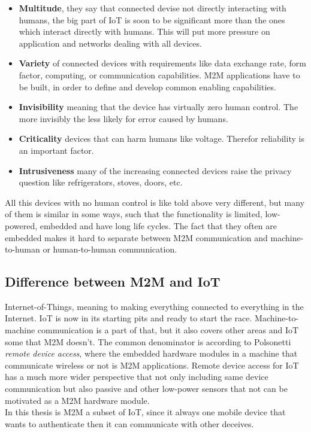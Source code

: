 \begin{itemize}
	\item[] \textbf{Multitude}, they say that connected devise not directly interacting with humans, the big part of IoT is soon to be significant more than the ones which interact directly with humans. This will put more pressure on application and networks dealing with all devices.
	\item[] \textbf{Variety} of connected devices with requirements like data exchange rate, form factor, computing, or communication capabilities. M2M applications have to be built, in order to define and develop common enabling capabilities.
	\item[] \textbf{Invisibility} meaning that the device has virtually zero human control. The more invisibly the less likely for error caused by humans. 
	\item[] \textbf{Criticality} devices that can harm humans like voltage. Therefor reliability is an important factor. 
	\item[] \textbf{Intrusiveness} many of the increasing connected devices raise the privacy question like refrigerators, stoves, doors, etc.
\end{itemize}
All this devices with no human control is like told above very different, but many of them is similar in some ways, such that the functionality is limited, low-powered, embedded and have long life cycles. The fact that they often are embedded makes it hard to separate between M2M communication and machine-to-human or human-to-human communication.
\cite[p.~2-4]{m2mComm}

\subsection{Difference between M2M and IoT}
Internet-of-Things, meaning to making everything connected to everything in the Internet. IoT is now in its starting pits and ready to start the race. Machine-to-machine communication is a part of that, but it also covers other areas and IoT some that M2M doesn't. The common denominator is according to Polsonetti \textit{remote device access}, where the embedded hardware modules in a machine that communicate wireless or not is M2M applications. Remote device access for IoT has a much more wider perspective that not only including same device communication but also passive and other low-power sensors that not can be motivated as a M2M hardware module.
\cite[]{cpM2MIoT}\\
In this thesis is M2M a subset of IoT, since it always one mobile device that wants to authenticate then it can communicate with other deceives.

